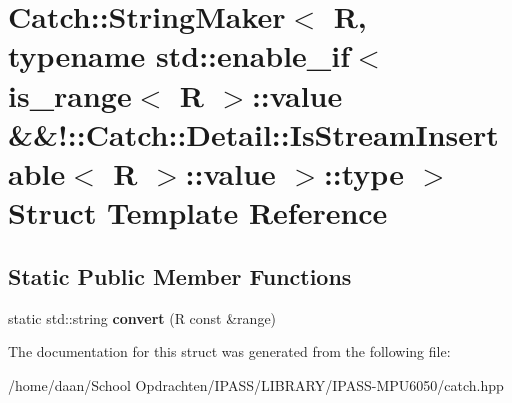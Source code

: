 \hypertarget{structCatch_1_1StringMaker_3_01R_00_01typename_01std_1_1enable__if_3_01is__range_3_01R_01_4_1_1ve8233c20b54b69b4771fbd413409d181}{}\section{Catch\+:\+:String\+Maker$<$ R, typename std\+:\+:enable\+\_\+if$<$ is\+\_\+range$<$ R $>$\+:\+:value \&\&!\+:\+:Catch\+:\+:Detail\+:\+:Is\+Stream\+Insertable$<$ R $>$\+:\+:value $>$\+:\+:type $>$ Struct Template Reference}
\label{structCatch_1_1StringMaker_3_01R_00_01typename_01std_1_1enable__if_3_01is__range_3_01R_01_4_1_1ve8233c20b54b69b4771fbd413409d181}
\subsection*{Static Public Member Functions}
\begin{DoxyCompactItemize}
\item 
\mbox{\label{structCatch_1_1StringMaker_3_01R_00_01typename_01std_1_1enable__if_3_01is__range_3_01R_01_4_1_1ve8233c20b54b69b4771fbd413409d181_ac6088db00103a7482fb9bc04b1603362}} 
static std\+::string {\bfseries convert} (R const \&range)
\end{DoxyCompactItemize}


The documentation for this struct was generated from the following file\+:\begin{DoxyCompactItemize}
\item 
/home/daan/\+School Opdrachten/\+I\+P\+A\+S\+S/\+L\+I\+B\+R\+A\+R\+Y/\+I\+P\+A\+S\+S-\/\+M\+P\+U6050/catch.\+hpp\end{DoxyCompactItemize}
